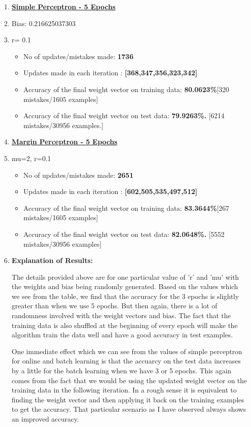 \documentclass[12pt, fullpage,letterpaper]{article}
\begin{document}
\begin{enumerate}
		
		
		\item[] \textbf {\underline{ Simple Perceptron - 5 Epochs }}
		\item[]	Bias: 0.216625037303 
		\item[]	r= 0.1 
		\begin{itemize}
			\item No of updates/mistakes made: \textbf{1736} 
			\item Updates made in each iteration :\textbf{ [368,347,356,323,342] } 
			\item Accuracy of the final weight vector on training data: \textbf{80.0623\%}[320 mistakes/1605 examples] 
			\item Accuracy of the final weight vector on test data: \textbf{79.9263\%.} [6214 mistakes/30956 examples.]
		\end{itemize}
		
		
		\item[] \textbf {\underline{ Margin Perceptron - 5 Epochs }}
	
		\item[]mu=2, r=0.1
		\begin{itemize}
			\item No of updates/mistakes made: \textbf{2651} 
			\item Updates made in each iteration :\textbf{ [602,505,535,497,512] } 
			\item Accuracy of the final weight vector on training data: \textbf{83.3644\%}[267 mistakes/1605 examples]
			\item Accuracy of the final weight vector on test data: \textbf{82.0648\%.} [5552 mistakes/30956 examples]
		\end{itemize}
		
	\item[] \textbf{Explanation of Results: }
	
	The details provided above are for one particular value of 'r' and 'mu'  with the weights and bias being randomly generated.  Based on the values which we see from the table, we find that the accuracy for the 3 epochs is slightly greater than when we use 5 epochs. But then again, there is a lot of randomness involved with the weight vectors and bias. The fact that the training data is also shuffled at the beginning of every epoch will make the algorithm train the data well and have a good accuracy in test examples.
	
	One immediate effect which we can see from the values of simple perceptron for online and batch learning is that the accuarcy on the test data increases by a little for the batch learning when we have 3 or 5 epochs. This again comes from the fact that we would be using the updated weight vector on the training data in the following iteration. In a rough sense it is equivalent to finding the weight vector and then applying it back on the training examples to get the accuracy. That particular scenario as I have observed always shows an improved accuracy.
	

\end{enumerate}
\end{document}
